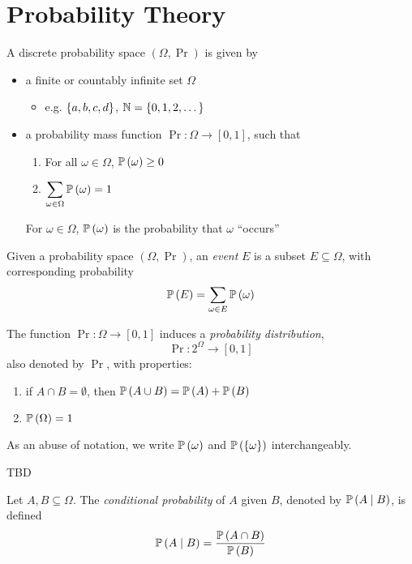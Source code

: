 \section{Probability Theory}
A discrete probability space $(\Omega, \Pr)$ is given by
\begin{itemize}
    \item a finite or countably infinite set $\Omega$
          \begin{itemize}
              \item e.g. $\left\lbrace a, b, c, d\right\rbrace$, $\mathbb{N} = \left\lbrace0, 1, 2, \dots\right\rbrace$
          \end{itemize}
    \item a probability mass function $\Pr: \Omega \to [0, 1]$, such that
          \begin{enumerate}[label=(\arabic*)]
              \item For all $\omega \in \Omega$, $\prob{\omega} \geq 0$
              \item $\displaystyle\sum_{\omega \in \Omega}\prob{\omega} = 1$
          \end{enumerate}
          For $\omega \in \Omega$, $\prob{\omega}$ is the probability that
          $\omega$ ``occurs''
\end{itemize}

\begin{definition}[Event]
    Given a probability space $(\Omega, \Pr)$, an \emph{event} $E$ is a subset
    $E \subseteq \Omega$, with corresponding probability
    \[\prob{E} = \sum_{\omega \in E}\prob{\omega}\]
\end{definition}

The function $\Pr: \Omega \to [0, 1]$ induces a \emph{probability distribution},
\[\Pr: 2^{\Omega} \to [0, 1]\]
also denoted by $\Pr$, with properties:
\begin{enumerate}[label=(\arabic*)]
    \item if $A \cap B = \emptyset$, then $\prob{A \cup B} = \prob{A} + \prob{B}$
    \item $\prob{\Omega} = 1$
\end{enumerate}
As an abuse of notation, we write $\prob{\omega}$ and $\prob{\set{\omega}}$ interchangeably.

\begin{example}
    TBD
\end{example}

\begin{definition}
    Let $A, B \subseteq \Omega$. The \emph{conditional probability} of $A$ given $B$,
    denoted by $\prob{A \given B}$, is defined
    \[\prob{A \given B} = \frac{\prob{A \cap B}}{\prob{B}}\]
\end{definition}

